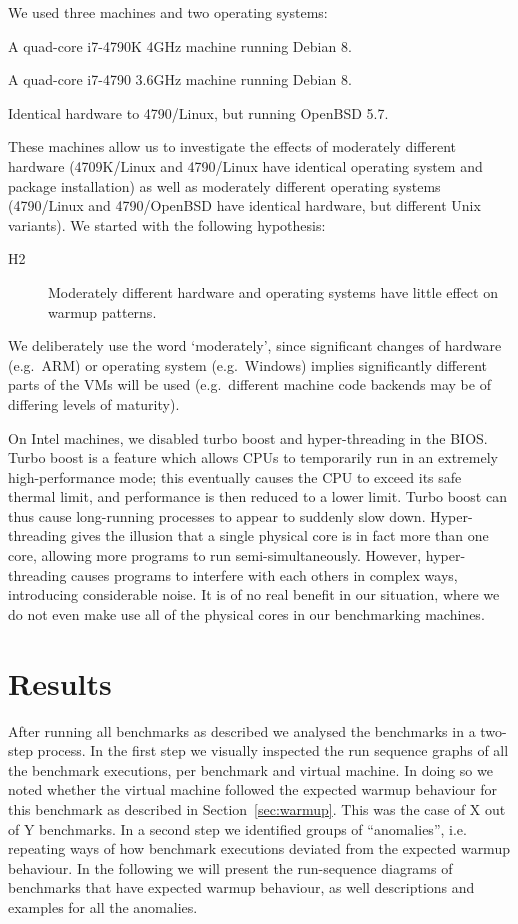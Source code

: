 \documentclass[10pt,preprint]{sigplanconf}
\newcommand{\hyptwo}{H2\xspace}
\newcommand{\bencherthree}{4709K/Linux\xspace}
\newcommand{\bencherfive}{4790/Linux\xspace}
\newcommand{\benchersix}{4790/OpenBSD\xspace}
\begin{document}
We used three machines and two operating systems:
\begin{description*}
  \item[\bencherthree] A quad-core i7-4790K 4GHz machine running Debian 8.
  \item[\bencherfive] A quad-core i7-4790 3.6GHz machine running Debian 8.
  \item[\benchersix] Identical hardware to \bencherfive, but running OpenBSD 5.7.
\end{description*}
These machines allow us to investigate the effects of moderately different
hardware (\bencherthree and \bencherfive have identical operating system and
package installation) as well as moderately different operating systems
(\bencherfive and \benchersix have identical hardware, but different Unix
variants). We started with the following hypothesis:
\begin{description}
  \item[\hyptwo] Moderately different hardware and operating systems have little effect on warmup patterns.
\end{description}
We deliberately use the word `moderately', since significant changes of hardware
(e.g.~ARM) or operating system (e.g.~Windows) implies significantly different
parts of the VMs will be used (e.g.~different machine code backends may be of
differing levels of maturity).

On Intel machines, we disabled turbo boost and hyper-threading in the BIOS. Turbo boost is a
feature which allows CPUs to temporarily run in an extremely high-performance
mode; this eventually causes the CPU to exceed its safe thermal limit, and
performance is then reduced to a lower limit. Turbo boost can thus cause long-running processes to
appear to suddenly slow down. Hyper-threading gives the illusion that a single
physical core is in fact more than one core, allowing more programs to
run semi-simultaneously. However, hyper-threading causes programs to interfere
with each others in complex ways, introducing considerable noise. It is of
no real benefit in our situation, where we do not even make use all of the
physical cores in our benchmarking machines.

\section{Results}
\label{sec:Results}

After running all benchmarks as described we analysed the benchmarks in a
two-step process. In the first step we visually inspected the run sequence
graphs of all the benchmark executions, per benchmark and virtual machine. In
doing so we noted whether the virtual machine followed the expected warmup
behaviour for this benchmark as described in Section~\ref{sec:warmup}. This was
the case of  X out of Y benchmarks. In a second step we
identified groups of ``anomalies'', i.e. repeating ways of how benchmark
executions deviated from the expected warmup behaviour. In the following we will
present the run-sequence diagrams of benchmarks that have expected warmup
behaviour, as well descriptions and examples for all the anomalies.
\end{document}
